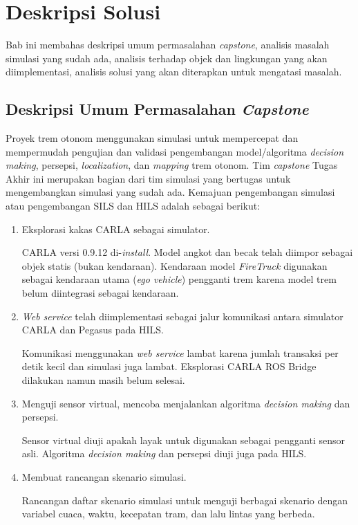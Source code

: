 \chapter{Deskripsi Solusi}


Bab ini membahas deskripsi umum permasalahan \textit{capstone}, analisis masalah
simulasi yang sudah ada, analisis terhadap objek dan lingkungan yang akan
diimplementasi, analisis solusi yang akan diterapkan untuk mengatasi masalah.

\section{Deskripsi Umum Permasalahan \textit{Capstone}}

Proyek trem otonom menggunakan simulasi untuk mempercepat dan mempermudah
pengujian dan validasi pengembangan model/algoritma \textit{decision making},
persepsi, \textit{localization}, dan \textit{mapping} trem otonom. Tim
\textit{capstone} Tugas Akhir ini merupakan bagian dari tim simulasi yang
bertugas untuk mengembangkan simulasi yang sudah ada. Kemajuan
pengembangan simulasi atau pengembangan SILS dan HILS adalah sebagai berikut:

\begin{enumerate}

	\item Eksplorasi kakas CARLA sebagai simulator.

	CARLA versi 0.9.12 di-\textit{install}. Model angkot dan becak telah diimpor
	sebagai objek statis (bukan kendaraan). Kendaraan model \textit{FireTruck}
	digunakan sebagai kendaraan utama (\textit{ego vehicle}) pengganti trem
	karena model trem belum diintegrasi sebagai kendaraan.

	\item \textit{Web service} telah diimplementasi sebagai jalur komunikasi
	antara simulator CARLA dan Pegasus pada HILS.

	Komunikasi menggunakan \textit{web service} lambat karena jumlah transaksi
	per detik kecil dan simulasi juga lambat. Eksplorasi CARLA ROS Bridge
	dilakukan namun masih belum selesai.

	\item Menguji sensor virtual, mencoba menjalankan algoritma \textit{decision
	making} dan persepsi.

	Sensor virtual diuji apakah layak untuk digunakan sebagai pengganti sensor
	asli. Algoritma \textit{decision making} dan persepsi diuji juga pada HILS.

	\item Membuat rancangan skenario simulasi.

	Rancangan daftar skenario simulasi untuk menguji berbagai skenario dengan
	variabel cuaca, waktu, kecepatan tram, dan lalu lintas yang berbeda.

\end{enumerate}


